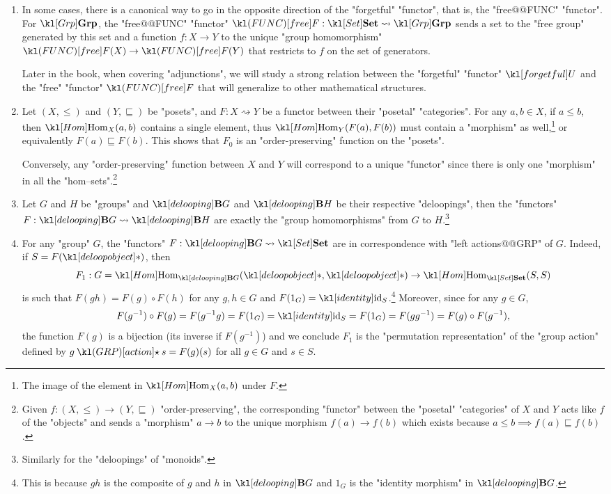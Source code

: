 \documentclass[main.tex]{subfiles}
\begin{document}
\begin{exmps}
\begin{enumerate}
		\item In some cases, there is a canonical way to go in the opposite direction of the "forgetful" "functor", that is, the "free@@FUNC" "functor". For $\catGrp$, the "free@@FUNC" "functor" $\free: \catSet \rightsquigarrow \catGrp$ sends a set to the "free group" generated by this set and a function $f: X\rightarrow Y$ to the unique "group homomorphism" $\free(X) \rightarrow \free(Y)$ that restricts to $f$ on the set of generators. %
		
		Later in the book, when covering "adjunctions", we will study a strong relation between the "forgetful" "functor" $\forget$ and the "free" "functor" $\free$ that will generalize to other mathematical structures.
		
		\item Let $(X, \leq)$ and $(Y, \sqsubseteq)$ be "posets", and $F:X\rightsquigarrow Y$ be a functor between their "posetal" "categories". For any $a, b \in X$, if $a\leq b$, then $\Hom_X(a,b)$ contains a single element, thus $\Hom_Y(F(a), F(b))$ must contain a "morphism" as well,\footnote{The image of the element in $\Hom_X(a,b)$ under $F$.} or equivalently $F(a) \sqsubseteq F(b)$. This shows that $F_0$ is an "order-preserving" function on the "posets".
		
		Conversely, any "order-preserving" function between $X$ and $Y$ will correspond to a unique "functor" since there is only one "morphism" in all the "hom--sets".\footnote{Given $f:(X,\leq) \rightarrow (Y,\sqsubseteq)$ "order-preserving", the corresponding "functor" between the "posetal" "categories" of $X$ and $Y$ acts like $f$ of the "objects" and sends a "morphism" $a \rightarrow b$ to the unique morphism $f(a) \rightarrow f(b)$ which exists because $a\leq b \implies f(a) \sqsubseteq f(b)$.}
				
		\item Let $G$ and $H$ be "groups" and $\deloop{G}$ and $\deloop{H}$ be their respective "deloopings", then the "functors" $F: \deloop{G} \rightsquigarrow \deloop{H}$ are exactly the "group homomorphisms" from $G$ to $H$.\footnote{Similarly for the "deloopings" of "monoids".} %
		
		\item\label{exmp:functorgrpaction} For any "group" $G$, the "functors" $F:\deloop{G} \rightsquigarrow \catSet$ are in correspondence with "left actions@@GRP" of $G$. Indeed, if $S = F(\deloopobject)$, then \[F_1: G = \Hom_{\deloop{G}}(\deloopobject, \deloopobject) \rightarrow \Hom_{\catSet}(S, S)\]
		is such that $F(gh) = F(g) \circ F(h)$ for any $g,h \in G$ and $F(1_G) = \id_S$.\footnote{This is because $gh$ is the composite of $g$ and $h$ in $\deloop{G}$ and $1_G$ is the "identity morphism" in $\deloop{G}$.} Moreover, since for any $g \in G$,
		\[ F(g^{-1}) \circ F(g) = F(g^{-1}g) = F(1_G) = \id_S = F(1_G) = F(gg^{-1}) = F(g) \circ F(g^{-1}),\]
		the function $F(g)$ is a bijection (its inverse if $F(g^{-1})$) and we conclude $F_1$ is the "permutation representation" of the "group action" defined by $g \act s = F(g)(s)$ for all $g \in G$ and $s \in S$.
		

\end{enumerate}
\end{exmps}
\end{document}
